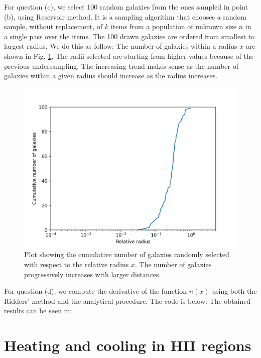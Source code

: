 For question (c), we select 100 random galaxies from the ones sampled in point (b), using Reservoir method. It is a sampling algorithm that chooses a random sample, without replacement, of $k$ items from a population of unknown size $n$ in a single pass over the items. The 100 drawn galaxies are ordered from smallest to largest radius. We do this as follow: 
The number of galaxies within a radius $x$ are shown in Fig. \ref{fig:cum_galaxies}. The radii selected are starting from higher values because of the previous undersampling. The increasing trend makes sense as the number of galaxies within a given radius should increase as the radius increases.

\begin{figure}[h!]
  \centering
  \includegraphics[width=0.9\linewidth]{./plots/my_solution_1c.png}
  \caption{Plot showing the cumulative number of galaxies randomly selected with respect to the relative radius $x$. The number of galaxies progressively increases with larger distances.}
  \label{fig:cum_galaxies}
\end{figure}

For question (d), we compute the derivative of the function $n(x)$ using both the Ridders' method and the analytical procedure. The code is below: 
The obtained results can be seen in: 


\section{Heating and cooling in HII regions}

